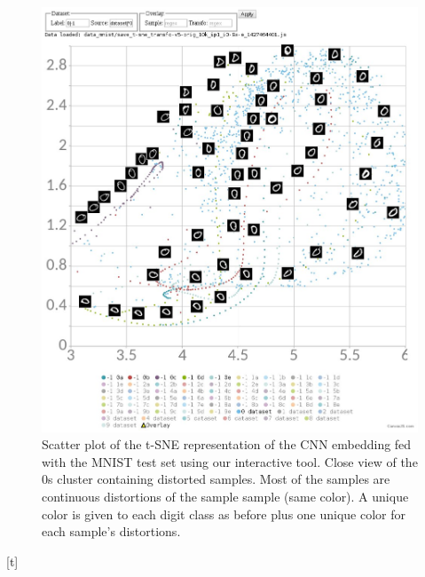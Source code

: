 \documentclass[a4paper,12pt]{report}
\begin{document}
\begin{figure}[t]
    \centering
    \includegraphics[width=\textwidth]{thesis_figures/mnist_nda_tsne2.jpg}
    \caption{Scatter plot of the t-SNE representation of the CNN embedding fed with the MNIST test set using our interactive tool. Close view of the 0s cluster containing distorted samples. Most of the samples are continuous distortions of the sample sample (same color). A unique color is given to each digit class as before plus one unique color for each sample's distortions.}
    \label{fig:mnist_nda_tsne2}
\end{figure}[t]
\end{document}
